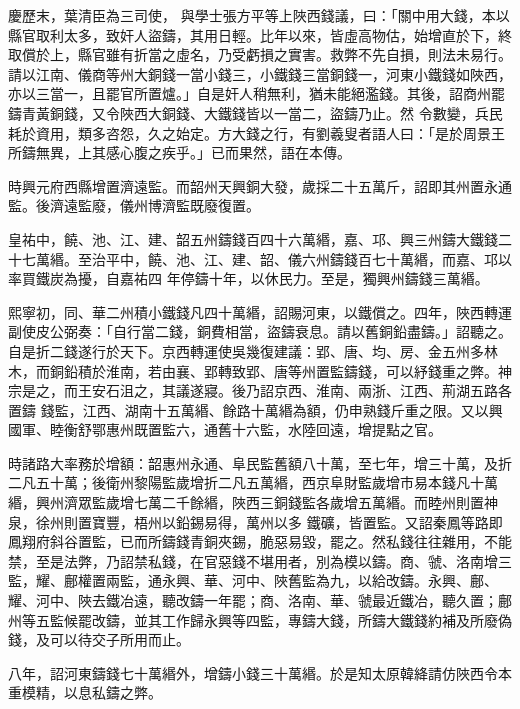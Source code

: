 \begin{pinyinscope}
 慶歷末，葉清臣為三司使，
 與學士張方平等上陜西錢議，曰：「關中用大錢，本以縣官取利太多，致奸人盜鑄，其用日輕。比年以來，皆虛高物估，始增直於下，終取償於上，縣官雖有折當之虛名，乃受虧損之實害。救弊不先自損，則法未易行。請以江南、儀商等州大銅錢一當小錢三，小鐵錢三當銅錢一，河東小鐵錢如陜西，亦以三當一，且罷官所置爐。」自是奸人稍無利，猶未能絕濫錢。其後，詔商州罷鑄青黃銅錢，又令陜西大銅錢、大鐵錢皆以一當二，盜鑄乃止。然
 令數變，兵民耗於資用，類多咨怨，久之始定。方大錢之行，有劉羲叟者語人曰：「是於周景王所鑄無異，上其感心腹之疾乎。」已而果然，語在本傳。



 時興元府西縣增置濟遠監。而韶州天興銅大發，歲採二十五萬斤，詔即其州置永通監。後濟遠監廢，儀州博濟監既廢復置。



 皇祐中，饒、池、江、建、韶五州鑄錢百四十六萬緡，嘉、邛、興三州鑄大鐵錢二十七萬緡。至治平中，饒、池、江、建、韶、儀六州鑄錢百七十萬緡，而嘉、邛以率買鐵炭為擾，自嘉祐四
 年停鑄十年，以休民力。至是，獨興州鑄錢三萬緡。



 熙寧初，同、華二州積小鐵錢凡四十萬緡，詔賜河東，以鐵償之。四年，陜西轉運副使皮公弼奏：「自行當二錢，銅費相當，盜鑄衰息。請以舊銅鉛盡鑄。」詔聽之。自是折二錢遂行於天下。京西轉運使吳幾復建議：郢、唐、均、房、金五州多林木，而銅鉛積於淮南，若由襄、郢轉致郢、唐等州置監鑄錢，可以紓錢重之弊。神宗是之，而王安石沮之，其議遂寢。後乃詔京西、淮南、兩浙、江西、荊湖五路各置鑄
 錢監，江西、湖南十五萬緡、餘路十萬緡為額，仍申熟錢斤重之限。又以興國軍、睦衡舒鄂惠州既置監六，通舊十六監，水陸回遠，增提點之官。



 時諸路大率務於增額：韶惠州永通、阜民監舊額八十萬，至七年，增三十萬，及折二凡五十萬；後衛州黎陽監歲增折二凡五萬緡，西京阜財監歲增市易本錢凡十萬緡，興州濟眾監歲增七萬二千餘緡，陜西三銅錢監各歲增五萬緡。而睦州則置神泉，徐州則置寶豐，梧州以鉛錫易得，萬州以多
 鐵礦，皆置監。又詔秦鳳等路即鳳翔府斜谷置監，已而所鑄錢青銅夾錫，脆惡易毀，罷之。然私錢往往雜用，不能禁，至是法弊，乃詔禁私錢，在官惡錢不堪用者，別為模以鑄。商、虢、洛南增三監，耀、鄜權置兩監，通永興、華、河中、陜舊監為九，以給改鑄。永興、鄜、耀、河中、陜去鐵冶遠，聽改鑄一年罷；商、洛南、華、虢最近鐵冶，聽久置；鄜州等五監候罷改鑄，並其工作歸永興等四監，專鑄大錢，所鑄大鐵錢約補及所廢偽錢，及可以待交子所用而止。



 八年，詔河東鑄錢七十萬緡外，增鑄小錢三十萬緡。於是知太原韓絳請仿陜西令本重模精，以息私鑄之弊。




\end{pinyinscope}
